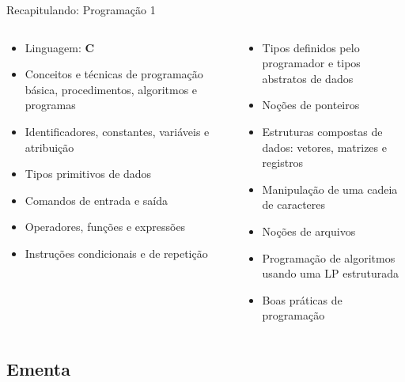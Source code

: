 \documentclass[10pt]{beamer}
\begin{document}
\begin{frame}{Recapitulando: Programação 1}
    \begin{columns}
    \begin{column}{0.5\textwidth}
        \minipage[c][0.7\textheight][s]{\columnwidth}
            \begin{itemize}
                \item Linguagem: \textbf{C}
                \item Conceitos e técnicas de programação básica, procedimentos, algoritmos e programas
                \item Identificadores, constantes, variáveis e atribuição
                \item Tipos primitivos de dados
                \item Comandos de entrada e saída
                \item Operadores, funções e expressões
                \item Instruções condicionais e de repetição
            \end{itemize}
            \vfill
        \endminipage
    \end{column}
    \begin{column}{0.5\textwidth}
        \minipage[c][0.7\textheight][s]{\columnwidth}
            \begin{itemize}
                \item Tipos definidos pelo programador e tipos abstratos de dados
                \item Noções de ponteiros
                \item Estruturas compostas de dados: vetores, matrizes e registros
                \item Manipulação de uma cadeia de caracteres
                \item Noções de arquivos
                \item Programação de algoritmos usando uma LP estruturada
                \item Boas práticas de programação
            \end{itemize}
            \vfill
        \endminipage
    \end{column}
    \end{columns}
\end{frame}

\subsection{Ementa}
\end{document}
